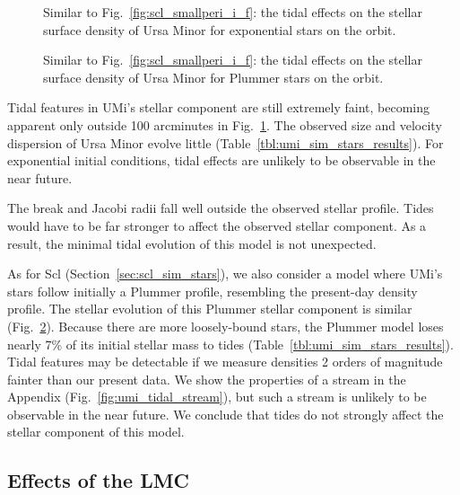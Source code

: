 \begin{figure}
\centering
{}
\caption[Ursa Minor simulated density profiles]{Similar to
Fig.~\ref{fig:scl_smallperi_i_f}: the tidal effects on the stellar
surface density of Ursa Minor for exponential stars on the \smallperi{}
orbit.}\label{fig:umi_smallperi_i_f}
\end{figure}

\begin{figure}
\centering
{}
\caption[Ursa Minor Plummer model density]{Similar to
Fig.~\ref{fig:scl_smallperi_i_f}: the tidal effects on the stellar
surface density of Ursa Minor for Plummer stars on the \smallperi{}
orbit.}\label{fig:umi_plummer_i_f}
\end{figure}

Tidal features in UMi's stellar component are still extremely faint,
becoming apparent only outside 100 arcminutes in
Fig.~\ref{fig:umi_smallperi_i_f}. The observed size and velocity
dispersion of Ursa Minor evolve little
(Table~\ref{tbl:umi_sim_stars_results}). For exponential initial
conditions, tidal effects are unlikely to be observable in the near
future.

The break and Jacobi radii fall well outside the observed stellar
profile. Tides would have to be far stronger to affect the observed
stellar component. As a result, the minimal tidal evolution of this
model is not unexpected.

As for Scl (Section~\ref{sec:scl_sim_stars}), we also consider a model
where UMi's stars follow initially a Plummer profile, resembling the
present-day density profile. The stellar evolution of this Plummer
stellar component is similar (Fig.~\ref{fig:umi_plummer_i_f}). Because
there are more loosely-bound stars, the Plummer model loses nearly 7\%
of its initial stellar mass to tides
(Table~\ref{tbl:umi_sim_stars_results}). Tidal features may be
detectable if we measure densities 2 orders of magnitude fainter than
our present data. We show the properties of a stream in the Appendix
(Fig.~\ref{fig:umi_tidal_stream}), but such a stream is unlikely to be
observable in the near future. We conclude that tides do not strongly
affect the stellar component of this model.

\subsection{Effects of the LMC}\label{effects-of-the-lmc}

